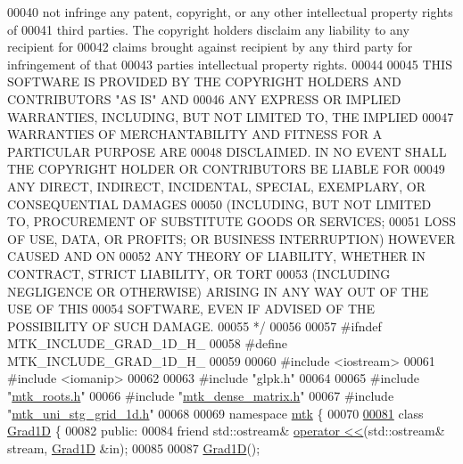 \begin{DoxyCode}
00040 \textcolor{comment}{not infringe any patent, copyright, or any other intellectual property rights of}
00041 \textcolor{comment}{third parties. The copyright holders disclaim any liability to any recipient for}
00042 \textcolor{comment}{claims brought against recipient by any third party for infringement of that}
00043 \textcolor{comment}{parties intellectual property rights.}
00044 \textcolor{comment}{}
00045 \textcolor{comment}{THIS SOFTWARE IS PROVIDED BY THE COPYRIGHT HOLDERS AND CONTRIBUTORS "AS IS" AND}
00046 \textcolor{comment}{ANY EXPRESS OR IMPLIED WARRANTIES, INCLUDING, BUT NOT LIMITED TO, THE IMPLIED}
00047 \textcolor{comment}{WARRANTIES OF MERCHANTABILITY AND FITNESS FOR A PARTICULAR PURPOSE ARE}
00048 \textcolor{comment}{DISCLAIMED. IN NO EVENT SHALL THE COPYRIGHT HOLDER OR CONTRIBUTORS BE LIABLE FOR}
00049 \textcolor{comment}{ANY DIRECT, INDIRECT, INCIDENTAL, SPECIAL, EXEMPLARY, OR CONSEQUENTIAL DAMAGES}
00050 \textcolor{comment}{(INCLUDING, BUT NOT LIMITED TO, PROCUREMENT OF SUBSTITUTE GOODS OR SERVICES;}
00051 \textcolor{comment}{LOSS OF USE, DATA, OR PROFITS; OR BUSINESS INTERRUPTION) HOWEVER CAUSED AND ON}
00052 \textcolor{comment}{ANY THEORY OF LIABILITY, WHETHER IN CONTRACT, STRICT LIABILITY, OR TORT}
00053 \textcolor{comment}{(INCLUDING NEGLIGENCE OR OTHERWISE) ARISING IN ANY WAY OUT OF THE USE OF THIS}
00054 \textcolor{comment}{SOFTWARE, EVEN IF ADVISED OF THE POSSIBILITY OF SUCH DAMAGE.}
00055 \textcolor{comment}{*/}
00056 
00057 \textcolor{preprocessor}{#ifndef MTK\_INCLUDE\_GRAD\_1D\_H\_}
00058 \textcolor{preprocessor}{#define MTK\_INCLUDE\_GRAD\_1D\_H\_}
00059 
00060 \textcolor{preprocessor}{#include <iostream>}
00061 \textcolor{preprocessor}{#include <iomanip>}
00062 
00063 \textcolor{preprocessor}{#include "glpk.h"}
00064 
00065 \textcolor{preprocessor}{#include "\hyperlink{mtk__roots_8h}{mtk\_roots.h}"}
00066 \textcolor{preprocessor}{#include "\hyperlink{mtk__dense__matrix_8h}{mtk\_dense\_matrix.h}"}
00067 \textcolor{preprocessor}{#include "\hyperlink{mtk__uni__stg__grid__1d_8h}{mtk\_uni\_stg\_grid\_1d.h}"}
00068 
00069 \textcolor{keyword}{namespace }\hyperlink{namespacemtk}{mtk} \{
00070 
\hypertarget{mtk__grad__1d_8h_source_l00081}{}\hyperlink{classmtk_1_1Grad1D}{00081} \textcolor{keyword}{class }\hyperlink{classmtk_1_1Grad1D}{Grad1D} \{
00082  \textcolor{keyword}{public}:
00084   \textcolor{keyword}{friend} std::ostream& \hyperlink{classmtk_1_1Grad1D_aeba97883d95c0b4546a98bebe8ef3106}{operator <<}(std::ostream& stream, \hyperlink{classmtk_1_1Grad1D}{Grad1D} &in);
00085 
00087   \hyperlink{classmtk_1_1Grad1D_ae21e6ac2652e653c48f15b304ee83a75}{Grad1D}();

\end{DoxyCode}
